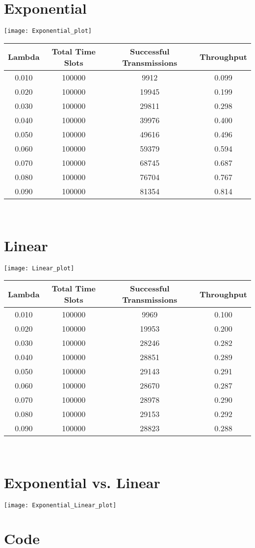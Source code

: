 \documentclass{article}
\begin{document}
\section*{Exponential}
\begin{center}
\texttt{[image: Exponential\_plot]}
\begin{tabular}{c | c | c | c}
	Lambda    & Total Time Slots & Successful Transmissions & Throughput \\
	\hline
	0.010     & 100000    & 9912      & 0.099     \\
	0.020     & 100000    & 19945     & 0.199     \\
	0.030     & 100000    & 29811     & 0.298     \\
	0.040     & 100000    & 39976     & 0.400     \\
	0.050     & 100000    & 49616     & 0.496     \\
	0.060     & 100000    & 59379     & 0.594     \\
	0.070     & 100000    & 68745     & 0.687     \\
	0.080     & 100000    & 76704     & 0.767     \\
	0.090     & 100000    & 81354     & 0.814     \\
\end{tabular} \\
\end{center}

\section*{Linear}
\begin{center}
\texttt{[image: Linear\_plot]}
\begin{tabular}{c | c | c | c}
	Lambda    & Total Time Slots & Successful Transmissions & Throughput \\
	\hline
	0.010     & 100000    & 9969      & 0.100     \\
	0.020     & 100000    & 19953     & 0.200     \\
	0.030     & 100000    & 28246     & 0.282     \\
	0.040     & 100000    & 28851     & 0.289     \\
	0.050     & 100000    & 29143     & 0.291     \\
	0.060     & 100000    & 28670     & 0.287     \\
	0.070     & 100000    & 28978     & 0.290     \\
	0.080     & 100000    & 29153     & 0.292     \\
	0.090     & 100000    & 28823     & 0.288     \\
\end{tabular} \\
\end{center}

\section*{Exponential vs. Linear}
\begin{center}
\texttt{[image: Exponential\_Linear\_plot]}
\end{center}

\section*{Code}

\end{document}
